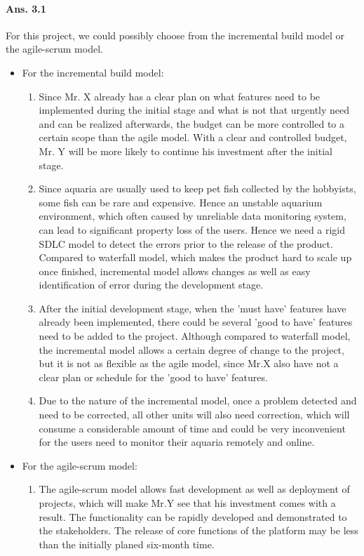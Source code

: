 \documentclass[paper=a4, fontsize=11pt]{scrartcl} %
\numberwithin{equation}{section} %
\numberwithin{figure}{section} %
\numberwithin{table}{section} %
\begin{document}
\paragraph{Ans. 3.1}For this project, we could possibly choose from the incremental build model or the agile-scrum model.
\begin{itemize}
	\item For the incremental build model:
	\begin{enumerate}
		\item Since Mr. X already has a clear plan on what features need to be implemented during the initial stage and what is not that urgently need and can be realized afterwards, the budget can be more controlled to a certain scope than the agile model. With a clear and controlled budget, Mr. Y will be more likely to continue his investment after the initial stage.
		\item Since aquaria are usually used to keep pet fish collected by the hobbyists, some fish can be rare and expensive\cite{aquawiki}. Hence an unstable aquarium environment, which often caused by unreliable data monitoring system, can lead to significant property loss  of the users. Hence we need a rigid SDLC model to detect the errors prior to the release of the product. Compared to waterfall model, which makes the product hard to scale up once finished, incremental model allows changes as well as easy identification of error during the development stage.
		\item After the initial development stage, when the 'must have' features have already been implemented, there could be several 'good to have' features need to be added to the project. Although compared to waterfall model, the incremental model allows a certain degree of change to the project, but it is not as flexible as the agile model, since Mr.X also have not a clear plan or schedule for the 'good to have' features. 
		\item Due to the nature of the incremental model, once a problem detected and need to be corrected, all other units will also need correction, which will consume a considerable amount of time\cite{incremodel} and could be very inconvenient for the users need to monitor their aquaria remotely and online.
	\end{enumerate}
	\item For the agile-scrum model:
	\begin{enumerate}
		\item The agile-scrum model allows fast development as well as deployment of projects, which will make Mr.Y see that his investment comes with a result. The functionality can be rapidly developed and demonstrated to the stakeholders. The release of core functions of the platform may be less than the initially planed six-month time. 

\end{enumerate}
\end{itemize}
\end{document}
